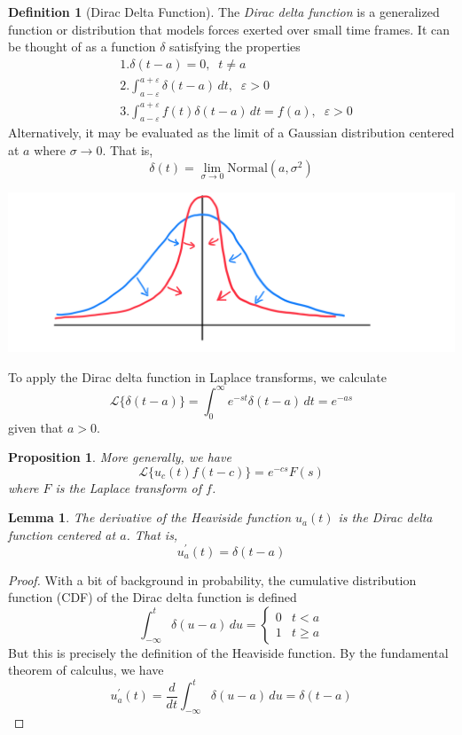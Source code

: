 \documentclass{article}
\newtheorem{proposition}[theorem]{Proposition}
\newtheorem{lemma}[theorem]{Lemma}
\theoremstyle{remark}
\theoremstyle{definition}
\newtheorem{definition}{Definition}[section]
\begin{document}
\begin{definition}[Dirac Delta Function]
The \textit{Dirac delta function} is a generalized function or distribution that models forces exerted over small time frames. It can be thought of as a function $\delta$ satisfying the properties 
\begin{align*}
    & 1. \delta (t - a) = 0, \;\; t \neq a \\
    & 2. \int_{a-\varepsilon}^{a+\varepsilon} \delta(t-a) \,dt, \;\; \varepsilon > 0 \\
    & 3. \int_{a-\varepsilon}^{a+\varepsilon} f(t) \delta(t-a) \,dt = f(a), \;\; \varepsilon > 0
\end{align*}
Alternatively, it may be evaluated as the limit of a Gaussian distribution centered at $a$ where $\sigma \rightarrow 0$. That is, 
\[\delta(t) = \lim_{\sigma \rightarrow 0} \text{Normal}(a, \sigma^2)\]
\begin{center}
    \includegraphics[scale=0.23]{img/Dirac_Delta.PNG}
\end{center}
\end{definition}

To apply the Dirac delta function in Laplace transforms, we calculate
\[\mathcal{L} \{ \delta(t-a)\} = \int_0^\infty e^{-st} \delta(t-a) \,dt = e^{-as}\]
given that $a>0$. 

\begin{proposition}
More generally, we have
\[\mathcal{L}\{u_c (t) f(t-c)\} = e^{-cs} F(s)\]
where $F$ is the Laplace transform of $f$. 
\end{proposition}

\begin{lemma}
The derivative of the Heaviside function $u_a (t)$ is the Dirac delta function centered at $a$. That is, 
\[u_a^\prime (t) = \delta (t - a)\]
\end{lemma}
\begin{proof}
With a bit of background in probability, the cumulative distribution function (CDF) of the Dirac delta function is defined
\[\int_{-\infty}^t \delta(u - a)\,du = \begin{cases}
0 & t < a \\
1 & t \geq a
\end{cases}\]
But this is precisely the definition of the Heaviside function. By the fundamental theorem of calculus, we have
\[u^\prime_a (t) = \frac{d}{d t} \int_{-\infty}^t \delta(u-a)\, du = \delta(t-a)\]
\end{proof}
\end{document}

